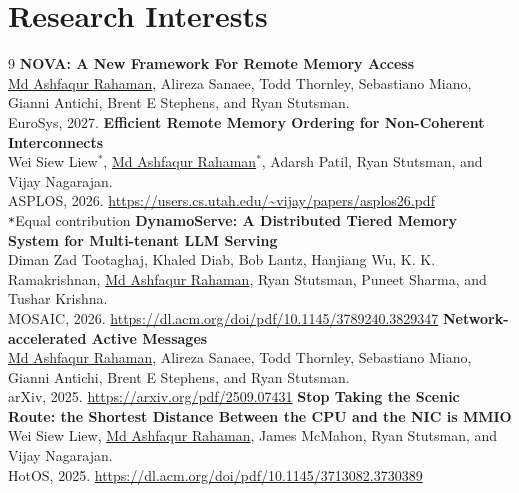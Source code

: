 \documentclass[11pt,a4paper,sans]{moderncv}
\begin{document}
\maketitle

\section{Research Interests}


\begin{thebibliography}{9}
   \textbf{NOVA: A New Framework For Remote Memory Access}\\
    \underline{Md Ashfaqur Rahaman}, Alireza Sanaee, Todd Thornley, Sebastiano Miano, Gianni Antichi, Brent E Stephens, and Ryan Stutsman.\\
    EuroSys, 2027.
   \textbf{Efficient Remote Memory Ordering for Non-Coherent Interconnects}\\
    Wei Siew Liew$^*$, \underline{Md Ashfaqur Rahaman$^*$}, Adarsh Patil, Ryan Stutsman, and Vijay Nagarajan.\\
    ASPLOS, 2026. \url{https://users.cs.utah.edu/~vijay/papers/asplos26.pdf}\\
    \texttt{*}Equal contribution
   \textbf{DynamoServe: A Distributed Tiered Memory System for Multi-tenant LLM Serving}\\
    Diman Zad Tootaghaj, Khaled Diab, Bob Lantz, Hanjiang Wu, K. K. Ramakrishnan, \underline{Md Ashfaqur Rahaman}, Ryan Stutsman, Puneet Sharma, and Tushar Krishna.\\
    MOSAIC, 2026. \url{https://dl.acm.org/doi/pdf/10.1145/3789240.3829347}
   \textbf{Network-accelerated Active Messages}\\
  \underline{Md Ashfaqur Rahaman}, Alireza Sanaee, Todd Thornley, Sebastiano Miano, Gianni Antichi, Brent E Stephens, and Ryan Stutsman.\\
    arXiv, 2025. \url{https://arxiv.org/pdf/2509.07431}
   \textbf{Stop Taking the Scenic Route: the Shortest Distance Between the CPU and the NIC is MMIO}\\
    Wei Siew Liew, \underline{Md Ashfaqur Rahaman}, James McMahon, Ryan Stutsman, and Vijay Nagarajan.\\
    HotOS, 2025. \url{https://dl.acm.org/doi/pdf/10.1145/3713082.3730389}
\end{thebibliography}
\end{document}
